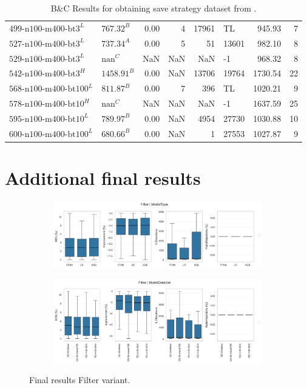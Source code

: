 \begin{table}[ht]
\begin{tabular}{llrrrlrr}
		$\text{499-n100-m400-bt3}^L$   & $\text{767.32}^B$  & 0.00 & 4     & 17961  & TL    & 945.93  & 7     \\
		$\text{527-n100-m400-bt3}^L$   & $\text{737.34}^A$  & 0.00 & 5     & 51     & 13601 & 982.10  & 8     \\
		$\text{529-n100-m400-bt3}^L$   & $\text{nan}^C$     & NaN  & NaN   & NaN    & -1    & 968.32  & 8     \\
		$\text{542-n100-m400-bt3}^H$   & $\text{1458.91}^B$ & 0.00 & NaN   & 13706  & 19764 & 1730.54 & 22    \\
		$\text{568-n100-m400-bt100}^L$ & $\text{811.87}^B$  & 0.00 & 7     & 396    & TL    & 1020.21 & 9     \\
		$\text{578-n100-m400-bt10}^H$  & $\text{nan}^C$     & NaN  & NaN   & NaN    & -1    & 1637.59 & 25    \\
		$\text{595-n100-m400-bt10}^L$  & $\text{789.97}^B$  & 0.00 & NaN   & 4954   & 27730 & 1030.88 & 10    \\
		$\text{600-n100-m400-bt100}^L$ & $\text{680.66}^B$  & 0.00 & NaN   & 1      & 27553 & 1027.87 & 9     \\
		\bottomrule
	\end{tabular}
	\caption{B\&C Results for obtaining save strategy dataset from \krebsADataSet.}
	\label{tab:bc_results_krebs}
\end{table}

\clearpage
\section{Additional final results}

\begin{figure}[!ht]
	\centering
	\begin{subfigure}[t]{\textwidth}
		\centering
		\includegraphics[width=0.9\linewidth]{pictures/final_results/ModelType_Filter_boxplot_final_results.png}
	\end{subfigure}
	\begin{subfigure}[t]{\textwidth}
		\centering
		\includegraphics[width=0.9\linewidth]{pictures/final_results/ModelDataSet_Filter_boxplot_final_results.png}
	\end{subfigure}
	\caption{Final results Filter variant.}
	\label{fig:final_results_filter_variant}
\end{figure}

